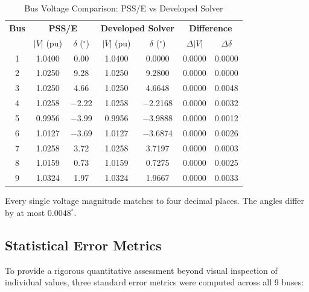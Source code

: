 \documentclass[12pt, a4paper]{article}
\begin{document}
\begin{table}[htbp]
\centering
\caption{Bus Voltage Comparison: PSS/E vs Developed Solver}
\label{tab:voltage_comparison}
\begin{tabular}{c c c c c c c}
\toprule
\textbf{Bus} & \multicolumn{2}{c}{\textbf{PSS/E}} & \multicolumn{2}{c}{\textbf{Developed Solver}} & \multicolumn{2}{c}{\textbf{Difference}} \\
 & $|V|$ (pu) & $\delta$ ($^{\circ}$) & $|V|$ (pu) & $\delta$ ($^{\circ}$) & $\Delta |V|$ & $\Delta \delta$ \\
\midrule
1 & 1.0400 & 0.00 & 1.0400 & 0.0000 & 0.0000 & 0.0000 \\
2 & 1.0250 & 9.28 & 1.0250 & 9.2800 & 0.0000 & 0.0000 \\
3 & 1.0250 & 4.66 & 1.0250 & 4.6648 & 0.0000 & 0.0048 \\
4 & 1.0258 & $-$2.22 & 1.0258 & $-$2.2168 & 0.0000 & 0.0032 \\
5 & 0.9956 & $-$3.99 & 0.9956 & $-$3.9888 & 0.0000 & 0.0012 \\
6 & 1.0127 & $-$3.69 & 1.0127 & $-$3.6874 & 0.0000 & 0.0026 \\
7 & 1.0258 & 3.72 & 1.0258 & 3.7197 & 0.0000 & 0.0003 \\
8 & 1.0159 & 0.73 & 1.0159 & 0.7275 & 0.0000 & 0.0025 \\
9 & 1.0324 & 1.97 & 1.0324 & 1.9667 & 0.0000 & 0.0033 \\
\bottomrule
\end{tabular}
\end{table}

Every single voltage magnitude matches to four decimal places. The angles differ by at most $0.0048^{\circ}$.

\subsection{Statistical Error Metrics}
To provide a rigorous quantitative assessment beyond visual inspection of individual values, three standard error metrics were computed across all 9 buses:

\begin{table}[htbp]
\centering
\caption{Quantified Error Analysis (Python vs PSS/E)}
\label{tab:error_metrics}
\end{table}
\end{document}
